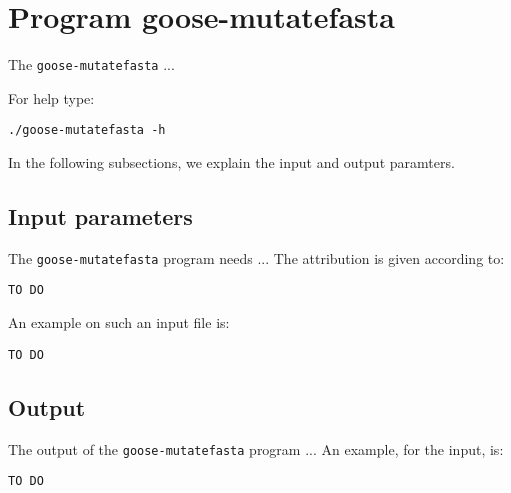 \section{Program goose-mutatefasta}
The \texttt{goose-mutatefasta} ...

For help type:
\begin{lstlisting}
./goose-mutatefasta -h
\end{lstlisting}
In the following subsections, we explain the input and output paramters.

\subsection{Input parameters}

The \texttt{goose-mutatefasta} program needs ...
The attribution is given according to:
\begin{lstlisting}
TO DO
\end{lstlisting}

An example on such an input file is:
\begin{lstlisting}
TO DO
\end{lstlisting}

\subsection{Output}
The output of the \texttt{goose-mutatefasta} program ...
An example, for the input, is:
\begin{lstlisting}
TO DO
\end{lstlisting}